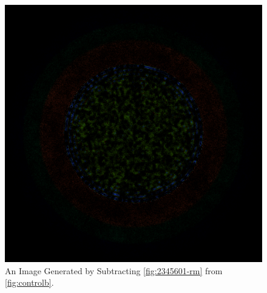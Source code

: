 \begin{figure}[H]
\centering
\includegraphics[width=0.6\linewidth]{figures/shuffle/diff-2345601}
\caption{An Image Generated by Subtracting \ref{fig:2345601-rm} from \ref{fig:controlb}.}
\label{fig:diff-2345601}
\end{figure}